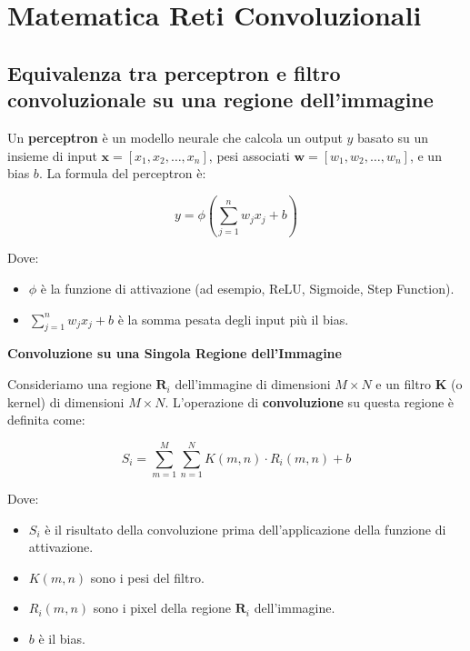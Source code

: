 \chapter{Matematica Reti Convoluzionali}
\label{appendix:B}

\section*{Equivalenza tra perceptron e filtro convoluzionale su una regione dell'immagine}

Un \textbf{perceptron} è un modello neurale che calcola un output \( y \) basato su un insieme di input \( \mathbf{x} = [x_1, x_2, \dots, x_n] \), pesi associati \( \mathbf{w} = [w_1, w_2, \dots, w_n] \), e un bias \( b \). La formula del perceptron è:

\[
y = \phi\left(\sum_{j=1}^{n} w_j x_j + b\right)
\]

Dove:
\begin{itemize}
    \item \( \phi \) è la funzione di attivazione (ad esempio, ReLU, Sigmoide, Step Function).
    \item \( \sum_{j=1}^{n} w_j x_j + b \) è la somma pesata degli input più il bias.
\end{itemize}

\noindent\textbf{Convoluzione su una Singola Regione dell'Immagine}

\vspace{0.5em} %

\noindent Consideriamo una regione \( \mathbf{R}_i \) dell'immagine di dimensioni \( M \times N \) e un filtro \( \mathbf{K} \) (o kernel) di dimensioni \( M \times N \). L'operazione di \textbf{convoluzione} su questa regione è definita come:

\[
S_i = \sum_{m=1}^{M} \sum_{n=1}^{N} K(m,n) \cdot R_i(m,n) + b
\]

Dove:
\begin{itemize}
    \item \( S_i \) è il risultato della convoluzione prima dell'applicazione della funzione di attivazione.
    \item \( K(m,n) \) sono i pesi del filtro.
    \item \( R_i(m,n) \) sono i pixel della regione \( \mathbf{R}_i \) dell'immagine.
    \item \( b \) è il bias.
\end{itemize}

